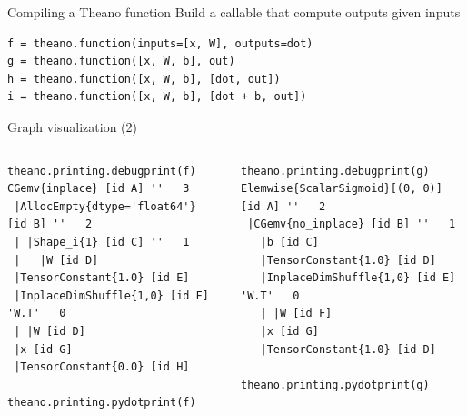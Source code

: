 \documentclass[a4paper,9pt]{beamer}
\begin{document}
\begin{frame}[fragile]{Compiling a Theano function}
  Build a callable that compute outputs given inputs
  \begin{verbatim}
f = theano.function(inputs=[x, W], outputs=dot)
g = theano.function([x, W, b], out)
h = theano.function([x, W, b], [dot, out])
i = theano.function([x, W, b], [dot + b, out])
  \end{verbatim}
\end{frame}

\begin{frame}[fragile]{Graph visualization (2)}
  \begin{columns}
    \begin{column}{0.48\textwidth}
\footnotesize
      \begin{verbatim}
theano.printing.debugprint(f)
CGemv{inplace} [id A] ''   3
 |AllocEmpty{dtype='float64'} [id B] ''   2
 | |Shape_i{1} [id C] ''   1
 |   |W [id D]
 |TensorConstant{1.0} [id E]
 |InplaceDimShuffle{1,0} [id F] 'W.T'   0
 | |W [id D]
 |x [id G]
 |TensorConstant{0.0} [id H]

theano.printing.pydotprint(f)
      \end{verbatim}
    \end{column}
    \begin{column}{0.48\textwidth}
\footnotesize
      \begin{verbatim}
theano.printing.debugprint(g)
Elemwise{ScalarSigmoid}[(0, 0)] [id A] ''   2
 |CGemv{no_inplace} [id B] ''   1
   |b [id C]
   |TensorConstant{1.0} [id D]
   |InplaceDimShuffle{1,0} [id E] 'W.T'   0
   | |W [id F]
   |x [id G]
   |TensorConstant{1.0} [id D]

theano.printing.pydotprint(g)
      \end{verbatim}
    \end{column}
  \end{columns}
\end{frame}
\end{document}
